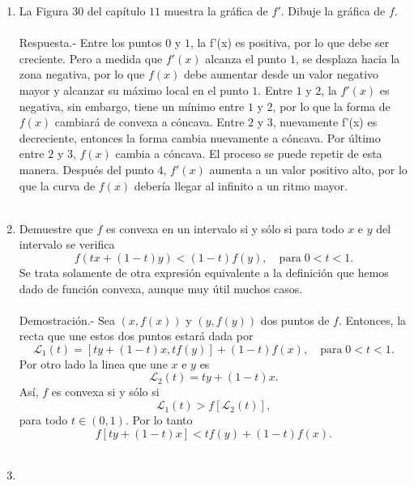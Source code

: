 \begin{enumerate}[\bfseries 1.]
\begin{enumerate}[(i)]
	\end{enumerate}
	\vspace{.5cm}

    \item La Figura 30 del capítulo $11$ muestra la gráfica de $f'$. Dibuje la gráfica de $f$.\\\\
	Respuesta.-\; Entre los puntos $0$ y $1$, la f'(x) es positiva, por lo que debe ser creciente. Pero a medida que $f'(x)$ alcanza el punto $1$, se desplaza hacia la zona negativa, por lo que $f(x)$ debe aumentar desde un valor negativo mayor y alcanzar su máximo local en el punto $1$. Entre $1$ y $2$, la $f'(x)$ es negativa, sin embargo, tiene un mínimo entre $1$ y $2$, por lo que la forma de $f(x)$ cambiará de convexa a cóncava.  Entre $2$ y $3$, nuevamente f'(x) es decreciente, entonces la forma cambia nuevamente a cóncava. Por último entre $2$ y $3$, $f(x)$ cambia a cóncava.  El proceso se puede repetir de esta manera. Después del punto $4$, $f'(x)$ aumenta a un valor positivo alto, por lo que la curva de $f(x)$ debería llegar al infinito a un ritmo mayor.\\\\

    \item Demuestre que $f$ es convexa en un intervalo si y sólo si para todo $x$ e $y$ del intervalo se verifica
    $$f(tx+(1-t)y)<(1-t)f(y),\quad \mbox{para}\; 0<t<1.$$
    Se trata solamente de otra expresión equivalente a la definición que hemos dado de función convexa, aunque muy útil muchos casos.\\\\
	Demostración.-\; Sea $(x,f(x))$ y $(y,f(y))$ dos puntos de $f$. Entonces, la recta que une estos dos puntos estará dada por
	$$\mathcal{L}_1(t)=\left[ty+(1-t)x,tf(y)\right]+(1-t)f(x),\quad \mbox{para}\; 0<t<1.$$
	Por otro lado la linea que une $x$ e $y$ es
	$$\mathcal{L}_2(t)=ty+(1-t)x.$$
	Así, $f$ es convexa si y sólo si 
	$$\mathcal{L}_1(t)>f\left[\mathcal{L}_2(t)\right],$$
	para todo $t\in (0,1)$. Por lo tanto
	$$f\left[ty+(1-t)x\right]<tf(y)+(1-t)f(x).$$\\

    \item 
	\begin{enumerate}[(a)]


\end{enumerate}
\end{enumerate}
